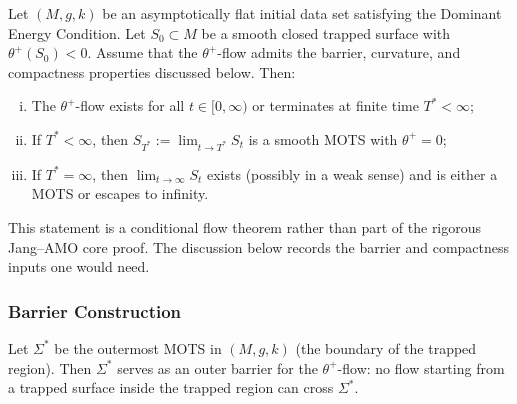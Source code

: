\begin{theorem}
\label{thm:longtime-existence}
Let $(M, g, k)$ be an asymptotically flat initial data set satisfying the Dominant Energy Condition. Let $S_0 \subset M$ be a smooth closed trapped surface with $\theta^+(S_0) < 0$. Assume that the $\theta^+$-flow admits the barrier, curvature, and compactness properties discussed below. Then:
\begin{enumerate}[(i)]
\item The $\theta^+$-flow exists for all $t \in [0, \infty)$ or terminates at finite time $T^* < \infty$;
\item If $T^* < \infty$, then $S_{T^*} := \lim_{t \to T^*} S_t$ is a smooth MOTS with $\theta^+ = 0$;
\item If $T^* = \infty$, then $\lim_{t \to \infty} S_t$ exists (possibly in a weak sense) and is either a MOTS or escapes to infinity.
\end{enumerate}
\end{theorem}

This statement is a conditional flow theorem rather than part of the rigorous Jang--AMO core proof. The discussion below records the barrier and compactness inputs one would need.

\subsubsection{Barrier Construction}

\begin{lemma}
\label{lem:mots-barrier}
Let $\Sigma^*$ be the outermost MOTS in $(M, g, k)$ (the boundary of the trapped region). Then $\Sigma^*$ serves as an outer barrier for the $\theta^+$-flow: no flow starting from a trapped surface inside the trapped region can cross $\Sigma^*$.
\end{lemma}

